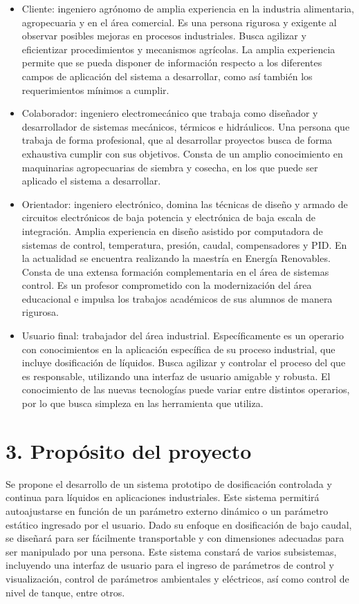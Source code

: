 \documentclass[
11pt, %
]{charter}
\begin{document}
\begin{itemize}
	\item Cliente: ingeniero agrónomo de amplia experiencia en la industria alimentaria, agropecuaria y en el área comercial. Es una persona rigurosa y exigente al observar posibles mejoras en procesos industriales. Busca agilizar y eficientizar procedimientos y mecanismos agrícolas. La amplia experiencia permite que se pueda disponer de información respecto a los diferentes campos de aplicación del sistema a desarrollar, como así también los requerimientos mínimos a cumplir. 
	\item Colaborador: ingeniero electromecánico que trabaja como diseñador y desarrollador de sistemas mecánicos, térmicos e hidráulicos. Una persona que trabaja de forma profesional, que al desarrollar proyectos busca de forma exhaustiva cumplir con sus objetivos. Consta de un amplio conocimiento en maquinarias agropecuarias de siembra y cosecha, en los que puede ser aplicado el sistema a desarrollar.
	\item Orientador: ingeniero electrónico, domina las técnicas de diseño y armado de circuitos electrónicos de baja potencia y electrónica de baja escala de integración. Amplia experiencia en diseño asistido por computadora de sistemas de control, temperatura, presión, caudal, compensadores y PID. En la actualidad se encuentra realizando la maestría en Energía Renovables. Consta de una extensa formación complementaria en el área de sistemas control. Es un profesor comprometido con la modernización del área educacional e impulsa los trabajos académicos de sus alumnos de manera rigurosa.
	\item Usuario final: trabajador del área industrial. Específicamente es un operario con conocimientos en la aplicación específica de su proceso industrial, que incluye dosificación de líquidos. Busca agilizar y controlar el proceso del que es responsable, utilizando una interfaz de usuario amigable y robusta. El conocimiento de las nuevas tecnologías puede variar entre distintos operarios, por lo que busca simpleza en las herramienta que utiliza.
\end{itemize}


\section{3. Propósito del proyecto}
\label{sec:proposito}

Se propone el desarrollo de un sistema prototipo de dosificación controlada y continua para líquidos en aplicaciones industriales. Este sistema permitirá autoajustarse en función de un parámetro externo dinámico o un parámetro estático ingresado por el usuario. Dado su enfoque en dosificación de bajo caudal, se diseñará para ser fácilmente transportable y con dimensiones adecuadas para ser manipulado por una persona. Este sistema constará de varios subsistemas, incluyendo una interfaz de usuario para el ingreso de parámetros de control y visualización, control de parámetros ambientales y eléctricos, así como control de nivel de tanque, entre otros.
\end{document}
